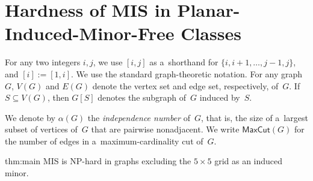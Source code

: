 \documentclass[a4paper,UKenglish,cleveref,autoref]{lipics-v2021}
\newcommand{\smis}{\textsc{MIS}\xspace}
\newcommand{\maxcut}{\mathsf{MaxCut}}
\begin{document}
\section{Hardness of MIS in Planar-Induced-Minor-Free Classes}

For any two integers $i, j$, we use $[i,j]$ as a~shorthand for $\{i, i+1, \ldots, j-1, j\}$, and $[i] := [1,i]$.
We use the standard graph-theoretic notation.
For any graph $G$, $V(G)$ and $E(G)$ denote the vertex set and edge set, respectively, of~$G$.
If $S \subseteq V(G)$, then $G[S]$ denotes the subgraph of~$G$ induced by~$S$.

\leavevmode
We denote by $\alpha(G)$ the \emph{independence number} of~$G$, that is, the size of a~largest subset of vertices of~$G$ that are pairwise nonadjacent.
We write $\maxcut(G)$ for the number of edges in a~maximum-cardinality cut of~$G$.

\begin{reptheorem}{thm:main}
\leavevmode
\smis is NP-hard in graphs excluding the $5 \times 5$ grid as an induced minor.
\end{reptheorem}
\end{document}
